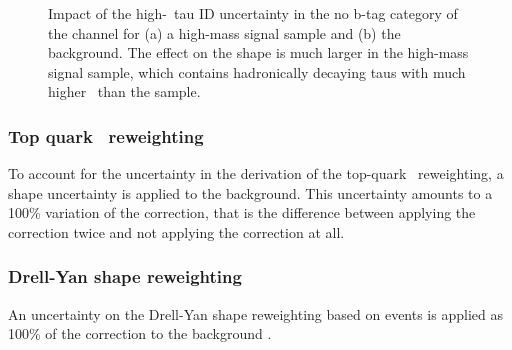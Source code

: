 \begin{figure}[h!]
\begin{center}
\end{center}
\caption[Impact of the high-\pT~tau ID uncertainty in the no b-tag category
of the \tautau channel for a high-mass signal sample and the \Ztautau
background.]{Impact of the high-\pT~tau ID uncertainty in the no b-tag category of the
\tautau channel for (a) a high-mass signal sample and (b) the \Ztautau background. The effect on the shape is much
larger in the high-mass signal sample, which contains hadronically decaying taus with much higher
\pT~than the \Ztautau sample.}
\label{fig:mssm_highpttauid_shapes}
\end{figure}
\subsubsection*{Top quark \pT~reweighting}
To account for the uncertainty in the derivation of the top-quark \pT~reweighting, a shape
uncertainty is applied to the \ttbar background. This uncertainty amounts to a 100\% variation
of the correction, that is the difference between applying the correction twice and not applying the correction at all.
\subsubsection*{Drell-Yan shape reweighting}
An uncertainty on the Drell-Yan shape reweighting based on \Zmm events
is applied as 100\% of the correction to the \Ztautau background \cite{CMS-PAS-HIG-16-037}. 
